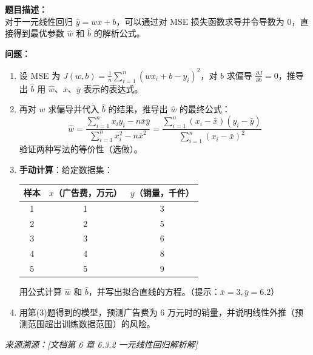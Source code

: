 \documentclass[a4paper,11pt]{ctexart}
\begin{document}
\begin{problembox}
    \textbf{题目描述：}\\
    对于一元线性回归 $\hat{y} = wx + b$，可以通过对 MSE 损失函数求导并令导数为 0，直接得到最优参数 $\hat{w}$ 和 $\hat{b}$ 的解析公式。

    \vspace{0.2cm}
    \textbf{问题：}
    \begin{enumerate}[(1)]
        \item 设 MSE 为 $J(w,b) = \frac{1}{n}\sum_{i=1}^n(wx_i+b-y_i)^2$，对 $b$ 求偏导 $\frac{\partial J}{\partial b}=0$，推导出 $\hat{b}$ 用 $\hat{w}$、$\bar{x}$、$\bar{y}$ 表示的表达式。

        \item 再对 $w$ 求偏导并代入 $\hat{b}$ 的结果，推导出 $\hat{w}$ 的最终公式：
        \[
        \hat{w} = \frac{\sum_{i=1}^n x_i y_i - n\bar{x}\bar{y}}{\sum_{i=1}^n x_i^2 - n\bar{x}^2} = \frac{\sum_{i=1}^n (x_i-\bar{x})(y_i-\bar{y})}{\sum_{i=1}^n (x_i-\bar{x})^2}
        \]
        验证两种写法的等价性（选做）。

        \item \textbf{手动计算}：给定数据集：

        \begin{center}
        \begin{tabular}{ccc}
            \toprule
            样本 & $x$（广告费，万元） & $y$（销量，千件） \\
            \midrule
            1 & 1 & 3 \\
            2 & 2 & 5 \\
            3 & 3 & 6 \\
            4 & 4 & 8 \\
            5 & 5 & 9 \\
            \bottomrule
        \end{tabular}
        \end{center}

        用公式计算 $\hat{w}$ 和 $\hat{b}$，并写出拟合直线的方程。（提示：$\bar{x}=3, \bar{y}=6.2$）

        \item 用第(3)题得到的模型，预测广告费为 6 万元时的销量，并说明线性外推（预测范围超出训练数据范围）的风险。
    \end{enumerate}
    {\color{gray}\small\textit{来源溯源：[文档第 6 章 6.3.2 一元线性回归解析解]}}
\end{problembox}
\end{document}
